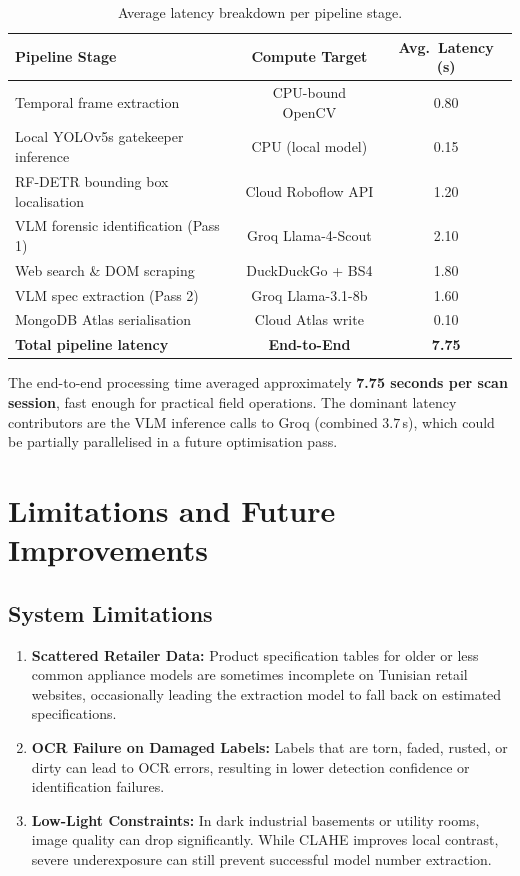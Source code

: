 \begin{table}[htbp]
\centering
\caption{Average latency breakdown per pipeline stage.}
\label{tab:ch4-latency}
\begin{tabular}{lcc}
\toprule
\textbf{Pipeline Stage} & \textbf{Compute Target} & \textbf{Avg.\ Latency (s)} \\
\midrule
Temporal frame extraction           & CPU-bound OpenCV      & 0.80 \\
Local YOLOv5s gatekeeper inference  & CPU (local model)     & 0.15 \\
RF-DETR bounding box localisation   & Cloud Roboflow API    & 1.20 \\
VLM forensic identification (Pass 1)& Groq Llama-4-Scout    & 2.10 \\
Web search \& DOM scraping          & DuckDuckGo + BS4      & 1.80 \\
VLM spec extraction (Pass 2)        & Groq Llama-3.1-8b     & 1.60 \\
MongoDB Atlas serialisation         & Cloud Atlas write     & 0.10 \\
\midrule
\textbf{Total pipeline latency}     & \textbf{End-to-End}   & \textbf{7.75} \\
\bottomrule
\end{tabular}
\end{table}

The end-to-end processing time averaged approximately \textbf{7.75 seconds per scan session}, fast enough for practical field operations. The dominant latency contributors are the VLM inference calls to Groq (combined $3.7$\,s), which could be partially parallelised in a future optimisation pass.

\section{Limitations and Future Improvements}
\label{sec:ch4-limitations}

\subsection{System Limitations}

\begin{enumerate}
  \item \textbf{Scattered Retailer Data:} Product specification tables for older or less common appliance models are sometimes incomplete on Tunisian retail websites, occasionally leading the extraction model to fall back on estimated specifications.
  \item \textbf{OCR Failure on Damaged Labels:} Labels that are torn, faded, rusted, or dirty can lead to OCR errors, resulting in lower detection confidence or identification failures.
  \item \textbf{Low-Light Constraints:} In dark industrial basements or utility rooms, image quality can drop significantly. While CLAHE improves local contrast, severe underexposure can still prevent successful model number extraction.
\end{enumerate}

